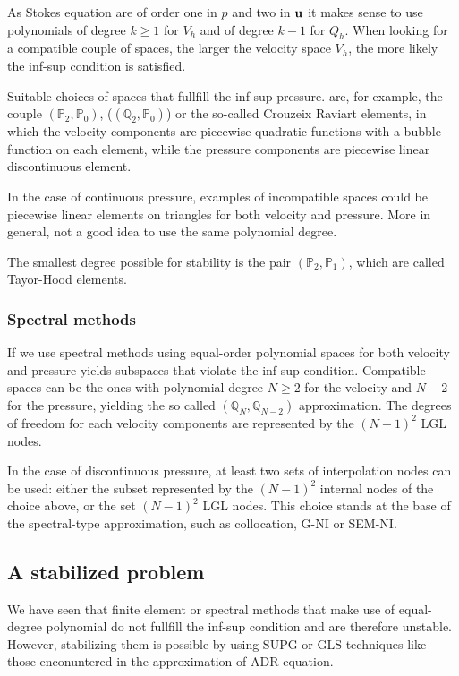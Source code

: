 As Stokes equation are of order one in \(p\) and two in \(\textbf{u}\) it makes sense to use polynomials of degree \(k \geq 1\) for \(V_h\) and of degree \(k-1\) for \(Q_h\).  When looking for a compatible couple of spaces, the larger the velocity space \(V_h\), the more likely the inf-sup condition is satisfied. 

Suitable choices of spaces that fullfill the inf sup pressure. are, for example, the couple \((\mathbb{P}_2, \mathbb{P}_0)\), (\((\mathbb{Q}_2, \mathbb{P}_0)\)) or the so-called Crouzeix Raviart elements, in which the velocity components are piecewise quadratic functions with a bubble function on each element, while the pressure components are piecewise linear discontinuous element.

In the case of continuous pressure, examples of incompatible spaces could be piecewise linear elements on triangles for both velocity and pressure. More in general, not a good idea to use the same polynomial degree.

The smallest degree possible for stability is the pair \((\mathbb{P}_2, \mathbb{P}_1)\), which are called Tayor-Hood elements.
\subsubsection*{Spectral methods}
If we use spectral methods using equal-order polynomial spaces for both velocity and pressure yields subspaces that violate the inf-sup condition. Compatible spaces can be the ones with polynomial degree \(N \geq 2\) for the velocity and \(N-2\) for the pressure, yielding the so called \((\mathbb{Q}_N, \mathbb{Q}_{N-2})\) approximation. The degrees of freedom for each velocity components are represented by the \((N+1)^2\) LGL nodes.

In the case of discontinuous pressure, at least two sets of interpolation nodes can be used: either the subset represented by the \((N-1)^2\) internal nodes of the choice above, or the set \((N-1)^2\) LGL nodes. This choice stands at the base of the spectral-type approximation, such as collocation, G-NI or SEM-NI.
\subsection{A stabilized problem}
We have seen that finite element or spectral methods that make use of equal-degree polynomial do not fullfill the inf-sup condition and are therefore unstable. However, stabilizing them is possible by using SUPG or GLS techniques like those enconuntered in the approximation of ADR equation.

